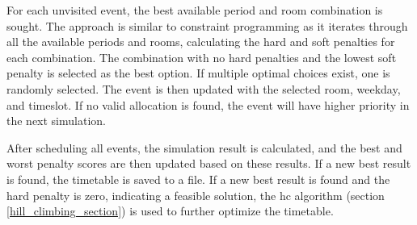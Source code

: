 For each unvisited event, the best available period and room combination is sought. The approach is similar to constraint programming as it iterates through all the available periods and rooms, calculating the hard and soft penalties for each combination. The combination with no hard penalties and the lowest soft penalty is selected as the best option. If multiple optimal choices exist, one is randomly selected. The event is then updated with the selected room, weekday, and timeslot. If no valid allocation is found, the event will have higher priority in the next simulation.

After scheduling all events, the simulation result is calculated, and the best and worst penalty scores are then updated based on these results. If a new best result is found, the timetable is saved to a file. If a new best result is found and the hard penalty is zero, indicating a feasible solution, the \ac{hc} algorithm (section \ref{hill_climbing_section}) is used to further optimize the timetable.


